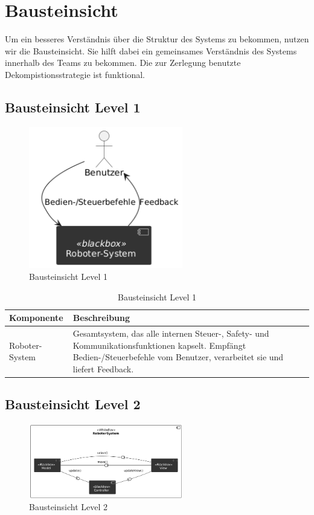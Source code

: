 

\chapter{Bausteinsicht}

Um ein besseres Verständnis über die Struktur des Systems zu bekommen, nutzen wir die Bausteinsicht. Sie hilft dabei ein gemeinsames Verständnis des Systems innerhalb des Teams zu bekommen.
Die zur Zerlegung benutzte Dekompistionsstrategie ist funktional. 

\section{Bausteinsicht Level 1}
 

\begin{figure}[ht] %
    \centering
    \includegraphics[width=0.6\textwidth]{diagrams/baustein_lvl_1_updated.png}
    \caption{Bausteinsicht Level 1}
\end{figure}

\begin{table}[h!]
\centering
\begin{tabular}{|p{4cm}|p{9cm}|}
\hline
\textbf{Komponente} & \textbf{Beschreibung} \\ \hline
Roboter-System & Gesamtsystem, das alle internen Steuer-, Safety- und Kommunikations­funktionen kapselt. Empfängt Bedien-/Steuerbefehle vom Benutzer, verarbeitet sie und liefert Feedback. \\ \hline
\end{tabular}
\caption{Bausteinsicht Level 1}
\label{tab:lvl1}
\end{table}

\newpage
\section{Bausteinsicht Level 2}
\begin{figure}[h] %
    \centering
    \includegraphics[width=0.6\textwidth]{diagrams/baustein_lvl_2_updated.png}
    \caption{Bausteinsicht Level 2}
\end{figure}

